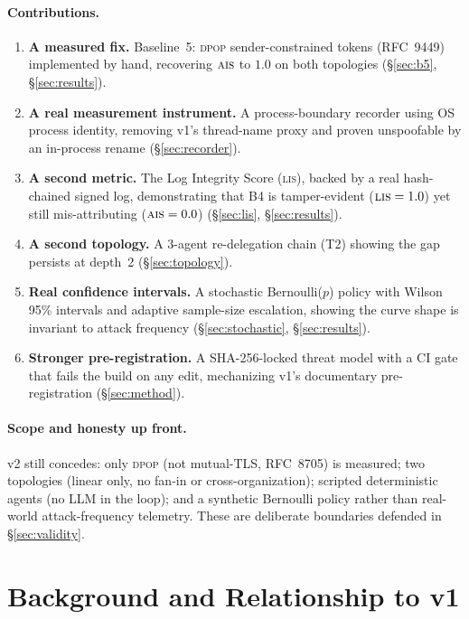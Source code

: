 \documentclass[11pt]{article}
\newcommand{\ais}{\textsc{ais}}
\newcommand{\lis}{\textsc{lis}}
\newcommand{\dpop}{\textsc{dpop}}
\begin{document}
\paragraph{Contributions.}
\begin{enumerate}[leftmargin=1.4em,itemsep=2pt]
  \item \textbf{A measured fix.} Baseline~5: \dpop{} sender-constrained
  tokens (RFC~9449) implemented by hand, recovering $\ais{}$ to $1.0$ on
  both topologies (\S\ref{sec:b5}, \S\ref{sec:results}).
  \item \textbf{A real measurement instrument.} A process-boundary recorder
  using OS process identity, removing v1's thread-name proxy and proven
  unspoofable by an in-process rename (\S\ref{sec:recorder}).
  \item \textbf{A second metric.} The Log Integrity Score (\lis{}), backed
  by a real hash-chained signed log, demonstrating that B4 is tamper-evident
  ($\lis{}=1.0$) yet still mis-attributing ($\ais{}=0.0$)
  (\S\ref{sec:lis}, \S\ref{sec:results}).
  \item \textbf{A second topology.} A 3-agent re-delegation chain (T2)
  showing the gap persists at depth~2 (\S\ref{sec:topology}).
  \item \textbf{Real confidence intervals.} A stochastic Bernoulli($p$)
  policy with Wilson 95\% intervals and adaptive sample-size escalation,
  showing the curve shape is invariant to attack frequency
  (\S\ref{sec:stochastic}, \S\ref{sec:results}).
  \item \textbf{Stronger pre-registration.} A SHA-256-locked threat model
  with a CI gate that fails the build on any edit, mechanizing v1's
  documentary pre-registration (\S\ref{sec:method}).
\end{enumerate}

\paragraph{Scope and honesty up front.}
v2 still concedes: only \dpop{} (not mutual-TLS, RFC~8705) is measured;
two topologies (linear only, no fan-in or cross-organization); scripted
deterministic agents (no LLM in the loop); and a synthetic Bernoulli policy
rather than real-world attack-frequency telemetry. These are deliberate
boundaries defended in \S\ref{sec:validity}.

\section{Background and Relationship to v1}
\label{sec:background}
\end{document}
